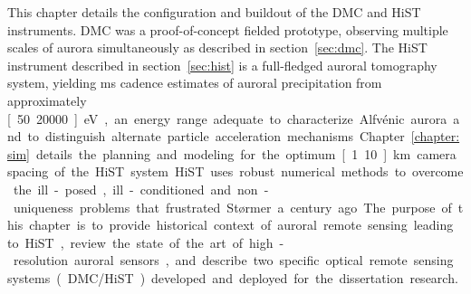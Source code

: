 This chapter details the configuration and buildout of the DMC and HiST instruments. 
DMC was a proof-of-concept fielded prototype, observing multiple scales of aurora simultaneously as described in section~\ref{sec:dmc}.
The HiST instrument described in section~\ref{sec:hist} is a full-fledged auroral tomography system, yielding \unit[20]{ms} cadence estimates of auroral precipitation from approximately \unit[50..20000]{eV}, an energy range adequate to characterize Alfvénic aurora and to distinguish alternate particle acceleration mechanisms.
Chapter~\ref{chapter:sim} details the planning and modeling for the optimum \unit[1..10]{km} camera spacing of the HiST system. 
HiST uses robust numerical methods to overcome the ill-posed, ill-conditioned and non-uniqueness problems that frustrated Størmer a century ago.
The purpose of this chapter is to provide historical context of auroral remote sensing leading to HiST, review the state of the art of high-resolution auroral sensors, and describe two specific optical remote sensing systems (DMC/HiST) developed and deployed for the dissertation research.







%

%


